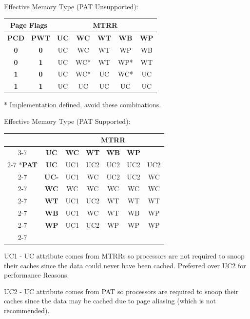 \documentclass{article}
\newcommand{\layout}[1]{\parbox{\linewidth}{#1}}
\begin{document}
\layout{
  Effective Memory Type (PAT Unsupported):
  \begin{table}[H]
    \centering
    \begin{tabular}{|c|c|c|c|c|c|c|}
      \hline \multicolumn{2}{|c|}{\textbf{Page Flags}} & \multicolumn{5}{c|}{\textbf{MTRR}} \\ \hline
      \textbf{PCD} & \textbf{PWT} & \textbf{UC} & \textbf{WC} & \textbf{WT} & \textbf{WB} & \textbf{WP} \\ \hline
      \textbf{0} & \textbf{0} & UC & WC & WT & WP & WB \\ \hline
      \textbf{0} & \textbf{1} & UC & WC* & WT & WP* & WT \\ \hline
      \textbf{1} & \textbf{0} & UC & WC* & UC & WC* & UC \\ \hline
      \textbf{1} & \textbf{1} & UC & UC & UC & UC & UC \\ \hline
    \end{tabular}
  \end{table}

  * Implementation defined, avoid these combinations.

  \bigskip \cite[Chapter~13.5.2.1]{sdm3}
} \bigskip

\layout{
  Effective Memory Type (PAT Supported):
  \begin{table}[H]
    \centering
    \begin{tabular}{c|c|c|c|c|c|c|}
      \multicolumn{2}{c}{} & \multicolumn{5}{c}{\textbf{MTRR}} \\ \cline{3-7}
      \multicolumn{2}{c|}{} & \textbf{UC} & \textbf{WC} & \textbf{WT} & \textbf{WB} & \textbf{WP} \\ \cline{2-7}
      \multirow[c]{6}*{\textbf{PAT}} & \textbf{UC} & UC1 & UC2 & UC2 & UC2 & UC2 \\ \cline{2-7}
      & \textbf{UC-} & UC1 & WC & UC2 & UC2 & WC \\ \cline{2-7}
      & \textbf{WC} & WC & WC & WC & WC & WC \\ \cline{2-7}
      & \textbf{WT} & UC1 & UC2 & WT & WT & WT \\ \cline{2-7}
      & \textbf{WB} & UC1 & WC & WT & WB & WP \\ \cline{2-7}
      & \textbf{WP} & UC1 & UC2 & WP & WP & WP \\ \cline{2-7}
    \end{tabular}
  \end{table}

  UC1 - UC attribute comes from MTRRs so processors are not required to snoop their caches since the data could never have been cached. Preferred over UC2 for performance Reasons.

  UC2 - UC attribute comes from PAT so processors are required to snoop their caches since the data may be cached due to page aliasing (which is not recommended).

  \bigskip \cite[Chapter~13.5.2.2]{sdm3}
}
\end{document}
